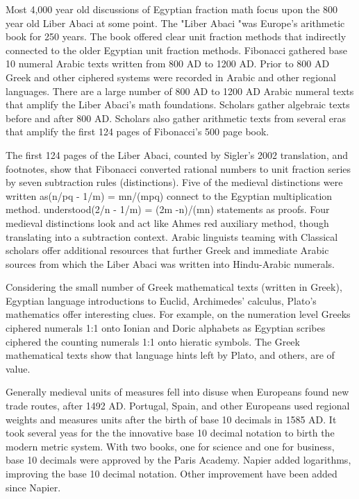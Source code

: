 \documentclass[12pt]{article}
\begin{document}
Most 4,000 year old discussions of Egyptian fraction math focus upon the 800 year old Liber Abaci at some point. The "Liber Abaci "was Europe's arithmetic book for 250 years. The book offered clear unit fraction methods that indirectly connected to the older Egyptian unit fraction methods. Fibonacci gathered base 10 numeral Arabic texts written from 800 AD to 1200 AD. Prior to 800 AD Greek and other ciphered systems were recorded in Arabic and other regional languages. There are a large number of 800 AD to 1200 AD Arabic numeral texts that amplify the Liber Abaci's math foundations. Scholars gather algebraic texts before and after 800 AD. Scholars also gather arithmetic texts from several eras that amplify the first 124 pages of Fibonacci's 500 page book. 

The first 124 pages of the Liber Abaci, counted by Sigler's 2002 translation, and footnotes, show that Fibonacci converted rational numbers to unit fraction series by seven subtraction rules (distinctions). Five of the medieval distinctions were written as(n/pq - 1/m) = mn/(mpq) connect to the Egyptian multiplication method.  understood(2/n - 1/m) = (2m -n)/(mn) statements as proofs. Four medieval distinctions look and act like Ahmes red auxiliary method, though translating into a subtraction context. Arabic linguists teaming with Classical scholars offer additional resources that further Greek and immediate Arabic sources from which the Liber Abaci was written into Hindu-Arabic numerals.

Considering the small number of Greek mathematical texts (written in Greek), Egyptian language introductions to Euclid, Archimedes' calculus, Plato's mathematics offer interesting clues. For example, on the numeration level Greeks ciphered numerals 1:1 onto Ionian and Doric alphabets as Egyptian scribes ciphered the counting numerals 1:1 onto hieratic symbols. The Greek mathematical texts show that language hints left by Plato, and others, are of value. 

Generally medieval units of measures fell into disuse when Europeans found new trade routes, after 1492 AD. Portugal, Spain, and other Europeans used regional weights and measures units after the birth of base 10 decimals in 1585 AD. It took several yeas for the the innovative base 10 decimal notation to birth the modern metric system. With two books, one for science and one for business, base 10 decimals were approved by the Paris Academy. Napier added logarithms, improving the base 10 decimal notation. Other improvement have been added since Napier. 
\end{document}
